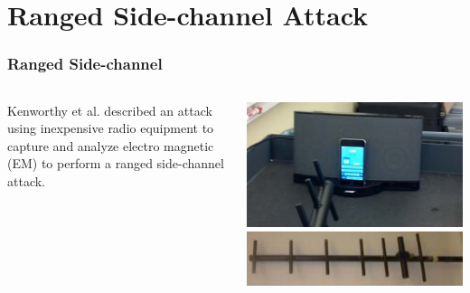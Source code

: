 \documentclass{beamer}
\begin{document}
\begin{frame}
\begin{columns}[t]
\begin{column}{.45\textwidth}
		\end{column}
		\end{columns}
		\end{frame}
		
		
		
\section{Ranged Side-channel Attack}
        \begin{frame}
		\frametitle{Ranged Side-channel}
		\begin{columns}
		\begin{column}{.45\textwidth}
		Kenworthy et al. described an attack using inexpensive radio equipment to capture and analyze electro magnetic (EM) to perform a ranged side-channel attack.
		\end{column}
		\begin{column}{.45\textwidth}
		
			 \includegraphics[width=\textwidth]{Images/antennaWithDevice.png}
			 \linebreak
			\includegraphics[width=\textwidth]{Images/antenna.png} 
			
		\end{column}
		\end{columns}
		\end{frame}
\end{document}
